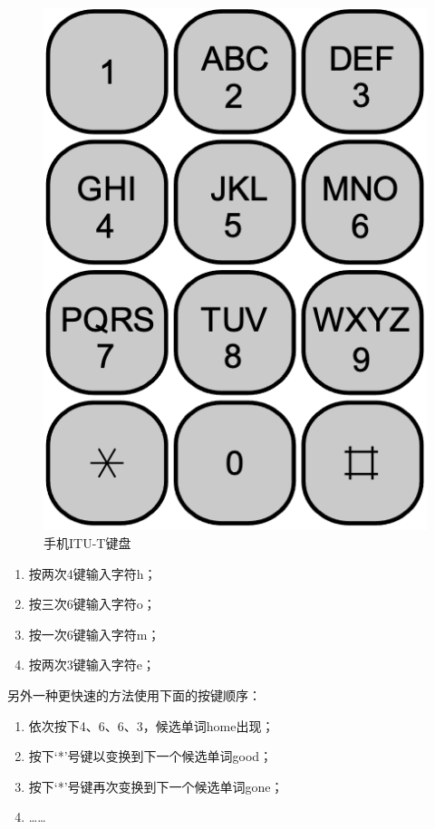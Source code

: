 \documentclass[b5paper]{ctexart}
\begin{document}
\begin{figure}[htbp]
  \centering
  \includegraphics[scale=0.4]{img/itu-t}
  \caption{手机ITU-T键盘}
  \label{fig:itut-keypad}
\end{figure}

\begin{enumerate}
\item 按两次4键输入字符h；
\item 按三次6键输入字符o；
\item 按一次6键输入字符m；
\item 按两次3键输入字符e；
\end{enumerate}

另外一种更快速的方法使用下面的按键顺序：

\begin{enumerate}
\item 依次按下4、6、6、3，候选单词home出现；
\item 按下‘*’号键以变换到下一个候选单词good；
\item 按下‘*’号键再次变换到下一个候选单词gone；
\item ……
\end{enumerate}
\end{document}
